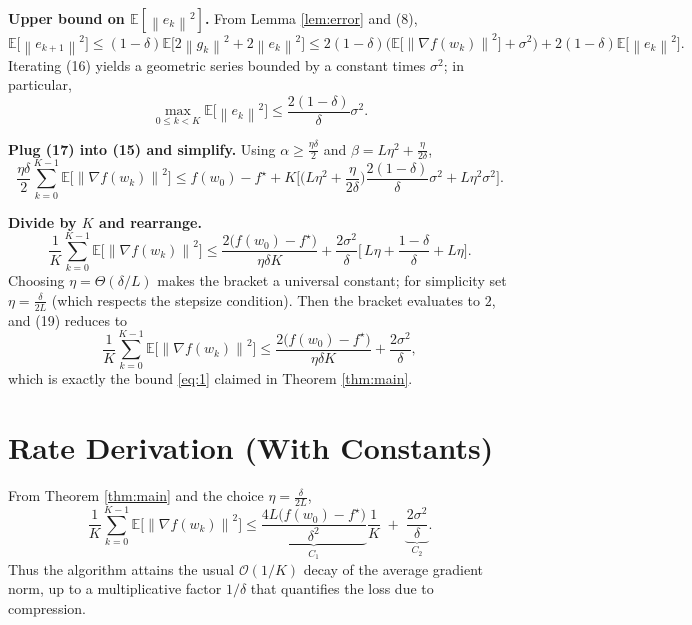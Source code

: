 \documentclass{article}
\newcommand{\E}{\mathbb{E}}
\newcommand{\norm}[1]{\left\|#1\right\|}
\begin{document}
\begin{enumerate}[label={[\textbf{Step \arabic*}]}]
\item \textbf{Upper bound on $\E[\norm{e_k}^{2}]$.}  
From Lemma \ref{lem:error} and (8),
\[
\E\!\big[\norm{e_{k+1}}^{2}\big]\le (1-\delta)\E\!\big[2\norm{g_k}^{2}+2\norm{e_k}^{2}\big]
\le 2(1-\delta)\big(\E\!\big[\norm{\nabla f(w_k)}^{2}\big]+\sigma^{2}\big)
   +2(1-\delta)\E\!\big[\norm{e_k}^{2}\big]. \tag{16}
\]
Iterating (16) yields a geometric series bounded by a constant times $\sigma^{2}$; in particular,
\[
\max_{0\le k<K}\E\!\big[\norm{e_k}^{2}\big]\le \frac{2(1-\delta)}{\delta}\sigma^{2}. \tag{17}
\]

\item \textbf{Plug (17) into (15) and simplify.}  
Using $\alpha\ge\frac{\eta\delta}{2}$ and $\beta = L\eta^{2}+\frac{\eta}{2\delta}$,
\[
\frac{\eta\delta}{2}\sum_{k=0}^{K-1}\E\!\big[\norm{\nabla f(w_k)}^{2}\big]
\le f(w_0)-f^\star
+K\Bigg[\Big(L\eta^{2}+\frac{\eta}{2\delta}\Big)\frac{2(1-\delta)}{\delta}\sigma^{2}
      +L\eta^{2}\sigma^{2}\Bigg]. \tag{18}
\]

\item \textbf{Divide by $K$ and rearrange.}  
\[
\frac1K\sum_{k=0}^{K-1}\E\!\big[\norm{\nabla f(w_k)}^{2}\big]
\le \frac{2\big(f(w_0)-f^\star\big)}{\eta\delta K}
   +\frac{2\sigma^{2}}{\delta}
   \Bigg[\,L\eta\!+\!\frac{1-\delta}{\delta}
         +L\eta\Bigg]. \tag{19}
\]
Choosing $\eta = \Theta(\delta/L)$ makes the bracket a universal constant; for simplicity set $\eta = \frac{\delta}{2L}$ (which respects the stepsize condition). Then the bracket evaluates to $2$, and (19) reduces to
\[
\frac1K\sum_{k=0}^{K-1}\E\!\big[\norm{\nabla f(w_k)}^{2}\big]
\le \frac{2\big(f(w_0)-f^\star\big)}{\eta\delta K}
   +\frac{2\sigma^{2}}{\delta},
\]
which is exactly the bound \eqref{eq:1} claimed in Theorem \ref{thm:main}. \hfill\qedsymbol
\end{enumerate}

\section*{Rate Derivation (With Constants)}
From Theorem \ref{thm:main} and the choice $\eta=\frac{\delta}{2L}$,
\[
\boxed{
\frac1K\sum_{k=0}^{K-1}\E\!\big[\norm{\nabla f(w_k)}^{2}\big]
\le
\underbrace{\frac{4L\big(f(w_0)-f^\star\big)}{\delta^{2}}}_{\displaystyle C_{1}}
\frac{1}{K}
\;+\;
\underbrace{\frac{2\sigma^{2}}{\delta}}_{\displaystyle C_{2}} }.
\]
Thus the algorithm attains the usual $\mathcal{O}(1/K)$ decay of the average gradient norm, up to a multiplicative factor $1/\delta$ that quantifies the loss due to compression.
\end{document}
